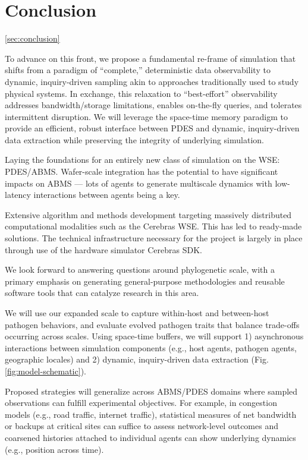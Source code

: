 \section{Conclusion} \ref{sec:conclusion}

To advance on this front, we propose a fundamental re-frame of simulation that shifts from a paradigm of ``complete,'' deterministic data observability to dynamic, inquiry-driven sampling akin to approaches traditionally used to study physical systems.
In exchange, this relaxation to ``best-effort'' observability addresses bandwidth/storage limitations, enables on-the-fly queries, and tolerates intermittent disruption.
We will leverage the space-time memory paradigm to provide an efficient, robust interface between PDES and dynamic, inquiry-driven data extraction while preserving the integrity of underlying simulation.

Laying the foundations for an entirely new class of simulation on the WSE: PDES/ABMS.
Wafer-scale integration has the potential to have significant impacts on ABMS --- lots of agents to generate multiscale dynamics with low-latency interactions between agents being a key.

Extensive algorithm and methods development targeting massively distributed computational modalities such as the Cerebras WSE.
This has led to ready-made solutions.
The technical infrastructure necessary for the project is largely in place through use of the hardware simulator Cerebras SDK.

We look forward to answering questions around phylogenetic scale, with a primary emphasis on generating general-purpose methodologies and reusable software tools that can catalyze research in this area.


We will use our expanded scale to capture within-host and between-host pathogen behaviors, and evaluate evolved pathogen traits that balance trade-offs occurring across scales.
Using space-time buffers, we will support 1) asynchronous interactions between simulation components (e.g., host agents, pathogen agents, geographic locales) and 2) dynamic, inquiry-driven data extraction (Fig. \ref{fig:model-schematic}).

Proposed strategies will generalize across ABMS/PDES domains where sampled observations can fulfill experimental objectives.
For example, in congestion models (e.g., road traffic, internet traffic), statistical measures of net bandwidth or backups at critical sites can suffice to assess network-level outcomes and coarsened histories attached to individual agents can show underlying dynamics (e.g., position across time).
%